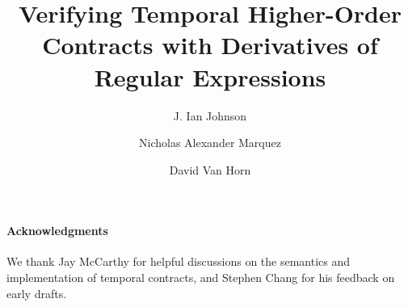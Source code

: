 \documentclass[article]{llncs}
\begin{document}
\title{Verifying Temporal Higher-Order Contracts with Derivatives of Regular Expressions}


\author{J. Ian Johnson \and Nicholas Alexander Marquez \and David Van Horn}

\maketitle

\begin{abstract}

\end{abstract}



\paragraph{Acknowledgments}{We thank Jay McCarthy for helpful discussions on the semantics
and implementation of temporal contracts, and Stephen Chang for his feedback on early drafts.}


\end{document}
